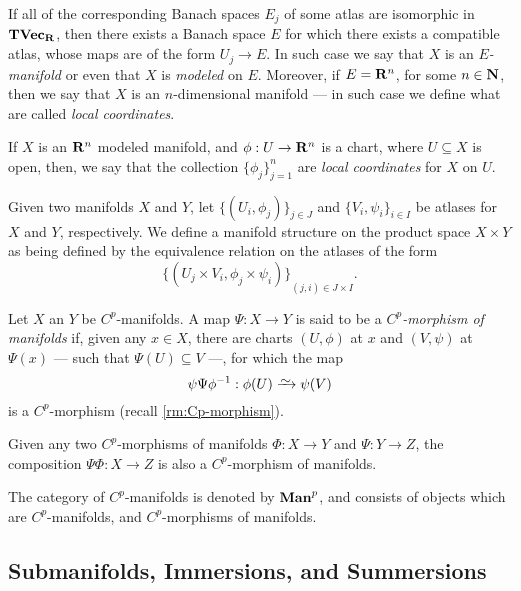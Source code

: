If all of the corresponding Banach spaces \(E_j\) of some atlas are isomorphic
in \({\textbf{TVec}}_{\mathbf{R}}\), then there exists a Banach space \(E\) for which there
exists a compatible atlas, whose maps are of the form \(U_j \to E\). In such
case we say that \(X\) is an \emph{\(E\)-manifold} or even that \(X\) is
\emph{modeled} on \(E\). Moreover, if \(E = \mathbf{R}^n\), for some \(n \in \mathbf{N}\), then
we say that \(X\) is an \(n\)-dimensional manifold --- in such case we define
what are called \emph{local coordinates}.

\begin{definition}
\label{def:local-coordinates}
If \(X\) is an \(\mathbf{R}^n\) modeled manifold, and \(\phi: U \to \mathbf{R}^n\) is a chart,
where \(U \subseteq X\) is open, then, we say that the collection
\(\{\phi_{j}\}_{j=1}^n\) are \emph{local coordinates} for \(X\) on \(U\).
\end{definition}

\begin{definition}
\label{def:product-Cp-manifold}
Given two manifolds \(X\) and \(Y\), let \(\{(U_{i}, \phi_j)\}_{j \in J}\) and
\(\{V_{i}, \psi_{i}\}_{i \in I}\) be atlases for \(X\) and \(Y\), respectively.
We define a manifold structure on the product space \(X \times Y\) as being
defined by the equivalence relation on the atlases of the form
\[
  {\{(U_{j} \times V_{i}, \phi_j \times \psi_i)\}}_{(j, i) \in J \times I}.
\]
\end{definition}

\begin{definition}
\label{def:morphism-manifolds}
Let \(X\) an \(Y\) be \(C^p\)-manifolds. A map \(\Psi: X \to Y\) is said to be a
\emph{\(C^p\)-morphism of manifolds} if, given any \(x \in X\), there are charts
\((U, \phi)\) at \(x\) and \((V, \psi)\) at \(\Psi(x)\) --- such that \(\Psi(U)
\subseteq V\) ---, for which the map
\[
  \psi \Psi \phi^{-1}: \phi(U) \isoto \psi(V)
\]
is a \(C^p\)-morphism (recall \cref{rm:Cp-morphism}).
\end{definition}

\begin{corollary}
\label{cor:composition-Cp-morphisms}
Given any two \(C^p\)-morphisms of manifolds \(\Phi: X \to Y\) and \(\Psi: Y \to
Z\), the composition \(\Psi \Phi: X \to Z\) is also a \(C^p\)-morphism of
manifolds.
\end{corollary}

\begin{definition}
\label{def:Cp-manifold-category}
The category of \(C^p\)-manifolds is denoted by \({\textbf{Man}}^p\), and consists of
objects which are \(C^p\)-manifolds, and \(C^p\)-morphisms of manifolds.
\end{definition}

\subsection{Submanifolds, Immersions, and Summersions}



